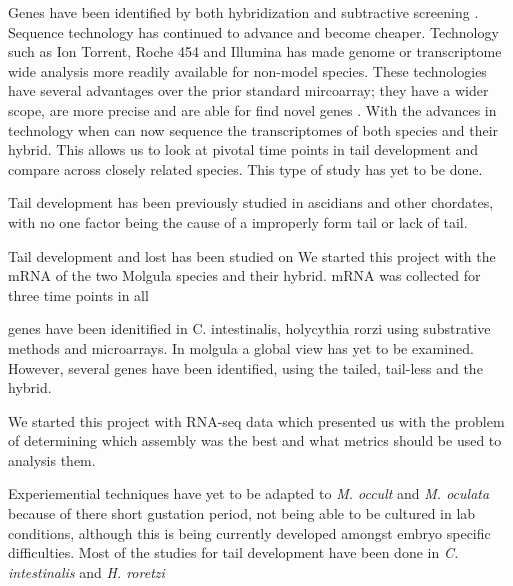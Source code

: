 Genes have been identified by both hybridization and subtractive screening \cite{jeffery_factors_1992,gyoja_analysis_2007,hotta_characterization_2000}. Sequence technology has continued to advance and become cheaper. Technology such as Ion Torrent, Roche 454 and Illumina has made genome or transcriptome wide analysis more readily available for non-model species. These technologies have several advantages over the prior standard mircoarray; they have a wider scope, are more precise and are able for find novel genes \cite{marioni_rna-seq:_2008}. With the advances in technology when can now sequence the transcriptomes of both species and their hybrid. This allows us to look at pivotal time points in tail development and compare across closely related species. This type of study has yet to be done.  

Tail development has been previously studied in ascidians and other chordates, with no one factor being the cause of a improperly form tail or lack of tail. 

Tail development and lost has been studied on 
We started this project with the mRNA of the two Molgula species and their hybrid. mRNA was collected for three time points in all 

genes have been idenitified in C. intestinalis, holycythia rorzi using substrative methods and microarrays. In molgula a global view has yet to be examined. However, several genes have been identified, using the tailed, tail-less and the hybrid. 

We started this project with RNA-seq data which presented us with the problem of determining which assembly was the best and what metrics should be used to analysis them.

Experiemential techniques have yet to be adapted to \textit{M. occult} and \textit{M. oculata} because of there short gustation period, not being able to be cultured in lab conditions, although this is being currently developed amongst embryo specific difficulties. Most of the studies for tail development have been done in \textit{C. intestinalis} and \textit{H. roretzi}  